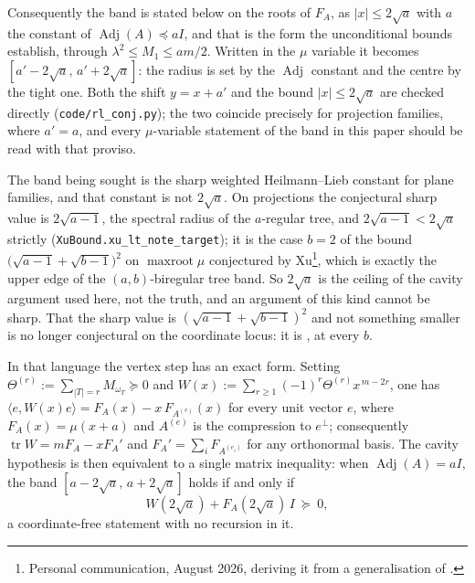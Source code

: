 \documentclass[11pt]{article}
\theoremstyle{remark}
\begin{document}
Consequently the band is stated below on the roots of $F_A$, as $|x|\le2\sqrt a$ with $a$ the
constant of $\operatorname{Adj}(A)\preceq aI$, and that is the form the unconditional bounds
establish, through $\lambda^2\le M_1\le am/2$. Written in the $\mu$ variable it becomes
$[a'-2\sqrt a,\,a'+2\sqrt a]$: the radius is set by the $\operatorname{Adj}$ constant and the
centre by the tight one. Both the shift $y=x+a'$ and the bound $|x|\le2\sqrt a$ are checked
directly (\texttt{code/rl\_conj.py}); the two coincide precisely for projection families, where
$a'=a$, and every $\mu$-variable statement of the band in this paper should be read with that
proviso.

The band being sought is the sharp weighted Heilmann--Lieb constant for plane families, and that
constant is not $2\sqrt a$. On projections the conjectural sharp value is $2\sqrt{a-1}$, the
spectral radius of the $a$-regular tree, and $2\sqrt{a-1}<2\sqrt a$ strictly
(\texttt{XuBound.xu\_lt\_note\_target}); it is the case $b=2$ of the bound
$\bigl(\sqrt{a-1}+\sqrt{b-1}\bigr)^2$ on $\operatorname{maxroot}\mu$ conjectured by
Xu\footnote{Personal communication, August 2026, deriving it from a generalisation of
\cite[Conjecture 1]{RL}.}, which is exactly the upper edge of the $(a,b)$-biregular tree band.
So $2\sqrt a$ is the ceiling of the cavity argument used here, not the truth, and an argument of
this kind cannot be sharp. That the sharp value is $(\sqrt{a-1}+\sqrt{b-1})^2$ and not something
smaller is no longer conjectural on the coordinate locus: it is
\cite{Supp2}, at every $b$.

In that language the vertex step has an exact form. Setting
$\Theta^{(r)}:=\sum_{|T|=r}M_{\omega_T}\succeq0$ and
$W(x):=\sum_{r\ge1}(-1)^r\Theta^{(r)}x^{\,m-2r}$, one has
$\langle e,W(x)e\rangle=F_A(x)-x\,F_{A^{(e)}}(x)$ for every unit vector $e$, where
$F_A(x)=\mu(x+a)$ and $A^{(e)}$ is the compression to $e^\perp$; consequently
$\operatorname{tr}W=mF_A-xF_A'$ and $F_A'=\sum_iF_{A^{(e_i)}}$ for any orthonormal
basis. The cavity hypothesis is then equivalent to a single matrix inequality: when
$\operatorname{Adj}(A)=aI$, the band $[a-2\sqrt a,\,a+2\sqrt a]$ holds if and only if
\[
W(2\sqrt a)+F_A(2\sqrt a)\,I\ \succeq\ 0 ,
\]
a coordinate-free statement with no recursion in it.
\end{document}

